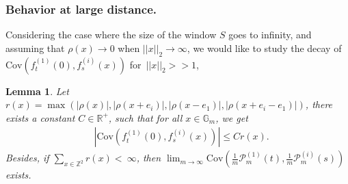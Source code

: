 \documentclass[12pt]{article}
\theoremstyle{Theorem}
\newtheorem{Lemma}[Theorem]{Lemma}
\theoremstyle{definition}
\begin{document}
\subsubsection{Behavior at large distance.}
Considering the case where the size of the window $S$ goes to infinity, and assuming that $\rho(x) \to 0$ when $||x||_{2} \to \infty$, we would like to study the decay of $\text{Cov}\left(f_{t}^{\scriptscriptstyle(1)}(0), f_{s}^{\scriptscriptstyle(i)}(x) \right)$ for~$||x||_{2} >> 1$,  
\begin{Lemma}
\label{lemmarx}
Let $r(x) = \max\left(|\rho(x)|, |\rho(x + e_i)|, |\rho(x-e_1)|, |\rho(x +e_i - e_1)| \right)$, there exists a constant $C \in \mathbb{R}^{+}$, such that for all $x \in \mathbb{G}_{m}$, we get
\begin{align*}
&  |\text{Cov}\left(f_{t}^{\scriptscriptstyle(1)}(0), f_{s}^{\scriptscriptstyle(i)}(x) \right)| \leq Cr(x). 
\end{align*}
Besides, if $\sum_{x \in \mathbb{Z}^{2}} r(x) <~\infty$, then 
$\lim_{m \to \infty}\text{Cov}\left(\frac{1}{m}\mathcal{P}_{m}^{\scriptscriptstyle (1)}(t), \frac{1}{m}\mathcal{P}_{m}^{\scriptscriptstyle (i)}(s) \right)$ exists. 
\end{Lemma}
\end{document}
